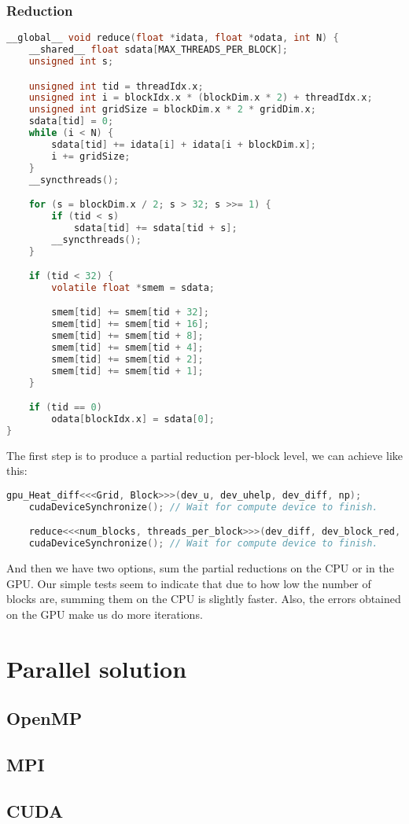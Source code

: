 \documentclass[a4paper, 10pt]{article}
\begin{document}
\subsubsection{Reduction}
\begin{lstlisting}[language=c, caption={Reduction kernel}]
__global__ void reduce(float *idata, float *odata, int N) {
    __shared__ float sdata[MAX_THREADS_PER_BLOCK];
    unsigned int s;

    unsigned int tid = threadIdx.x;
    unsigned int i = blockIdx.x * (blockDim.x * 2) + threadIdx.x;
    unsigned int gridSize = blockDim.x * 2 * gridDim.x;
    sdata[tid] = 0;
    while (i < N) {
        sdata[tid] += idata[i] + idata[i + blockDim.x];
        i += gridSize;
    }
    __syncthreads();

    for (s = blockDim.x / 2; s > 32; s >>= 1) {
        if (tid < s)
            sdata[tid] += sdata[tid + s];
        __syncthreads();
    }

    if (tid < 32) {
        volatile float *smem = sdata;

        smem[tid] += smem[tid + 32];
        smem[tid] += smem[tid + 16];
        smem[tid] += smem[tid + 8];
        smem[tid] += smem[tid + 4];
        smem[tid] += smem[tid + 2];
        smem[tid] += smem[tid + 1];
    }

    if (tid == 0)
        odata[blockIdx.x] = sdata[0];
}
\end{lstlisting}

The first step is to produce a partial reduction per-block level, we can achieve like this:
\begin{lstlisting}[language=c, caption={Reduction}, label={lst:cudareduction_block}]
    gpu_Heat_diff<<<Grid, Block>>>(dev_u, dev_uhelp, dev_diff, np);
    cudaDeviceSynchronize(); // Wait for compute device to finish.

    reduce<<<num_blocks, threads_per_block>>>(dev_diff, dev_block_red, (np - 2) * (np - 2));
    cudaDeviceSynchronize(); // Wait for compute device to finish.
\end{lstlisting}

And then we have two options, sum the partial reductions on the CPU or in the GPU. Our simple tests seem to indicate
that due to how low the number of blocks are, summing them on the CPU is slightly faster. Also, the errors obtained on the GPU
make us do more iterations.

\section{Parallel solution}

\subsection{OpenMP}

\subsection{MPI}

\subsection{CUDA}
\end{document}
